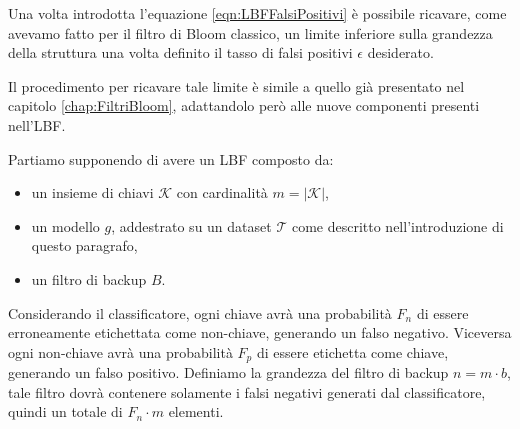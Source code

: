 \documentclass[../../main.tex]{subfiles}
\begin{document}
    Una volta introdotta l'equazione \ref{eqn:LBFFalsiPositivi} è possibile ricavare, come avevamo fatto per il filtro di Bloom classico, un limite inferiore sulla grandezza della struttura una volta definito il tasso di falsi positivi $\epsilon$ desiderato.

    Il procedimento per ricavare tale limite è simile a quello già presentato nel capitolo \ref{chap:FiltriBloom}, adattandolo però alle nuove componenti presenti nell'LBF.

    Partiamo supponendo di avere un LBF composto da: 
    \begin{itemize}
        \item un insieme di chiavi $\mathcal{K}$ con cardinalità $m = |\mathcal{K}|$,
        \item un modello $g$, addestrato su un dataset $\mathcal{T}$ come descritto nell'introduzione di questo paragrafo,
        \item un filtro di backup $B$.
    \end{itemize}
    Considerando il classificatore, ogni chiave avrà una probabilità $F_n$ di essere erroneamente etichettata come non-chiave, generando un falso negativo. Viceversa ogni non-chiave avrà una probabilità $F_p$ di essere etichetta come chiave, generando un falso positivo. Definiamo  la grandezza del filtro di backup $n = m \cdot b$, tale filtro dovrà contenere solamente i falsi negativi generati dal classificatore, quindi un totale di $F_n \cdot m$ elementi.
\end{document}
